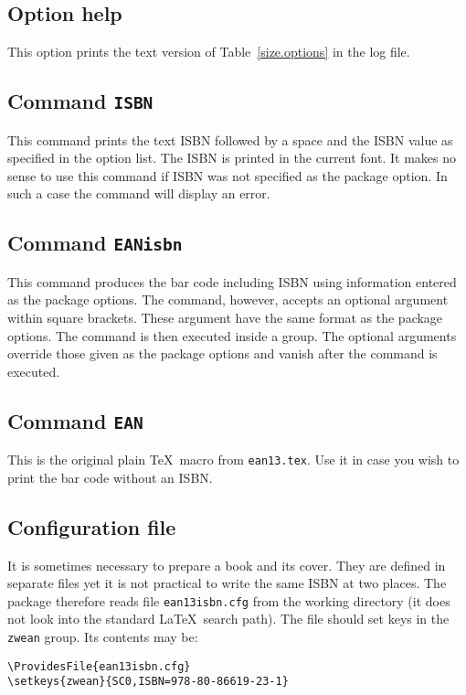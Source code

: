 \documentclass[11pt]{article}
\DeclareRobustCommand\cmd[1]{\texttt{\Bslash#1}}
\begin{document}
\subsection{Option help}
This option prints the text version of Table~\ref{size.options} in the log file.

\subsection{Command \cmd{ISBN}}
This command prints the text ISBN followed by a space and the ISBN value as specified in the option
list. The ISBN is printed in the current font. It makes no sense to use this command if ISBN was
not specified as the package option. In such a case the command will display an error.

\subsection{Command \cmd{EANisbn}}
This command produces the bar code including ISBN using information entered as the package options.
The command, however, accepts an optional argument within square brackets. These argument have the
same format as the package options. The command is then executed inside a group. The optional
arguments override those given as the package options and vanish after the command is executed.

\subsection{Command \cmd{EAN}}
This is the original plain \TeX\ macro from \texttt{ean13.tex}. Use it in case you wish to print
the bar code without an ISBN.

\subsection{Configuration file}
It is sometimes necessary to prepare a book and its cover. They are defined in separate files yet
it is not practical to write the same ISBN at two places. The package therefore reads file
\texttt{ean13isbn.cfg} from the working directory (it does not look into the standard \LaTeX\
search path). The file should set keys in the \texttt{zwean} group. Its contents may be:

\medskip
\begin{verbatim}
\ProvidesFile{ean13isbn.cfg}
\setkeys{zwean}{SC0,ISBN=978-80-86619-23-1}
\end{verbatim}
\end{document}
